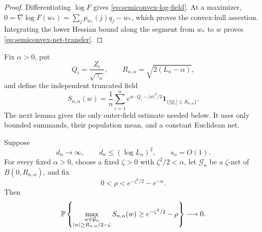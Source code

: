 \begin{proof}
Differentiating \(\log F\) gives \eqref{eq:semiconvex-log-field}.  At a
maximizer, \(0=\nabla\log F(w_*)=\sum_jp_{w_*}(j)q_j-w_*\), which proves
the convex-hull assertion.  Integrating the lower Hessian bound along the
segment from \(w_*\) to \(w\) proves
\eqref{eq:semiconvex-net-transfer}.
\end{proof}

Fix \(\alpha>0\), put
\[
 Q_i=\frac{Z_i}{\sqrt{\gamma_n}},\qquad
 R_{n,\alpha}=\sqrt{2(L_n-\alpha)},
\]
and define the independent truncated field
\[
 S_{n,\alpha}(w)
 =\frac1n\sum_{i=1}^n
 e^{w\cdot Q_i-|w|^2/2}
 \mathbf1_{\{|Q_i|\le R_{n,\alpha}\}}.
\]
The next lemma gives the only outer-field estimate needed below.  It uses
only bounded summands, their population mean, and a constant Euclidean net.

\begin{lemma}
\label{lem:slow-outside-shell}
Suppose
\[
 d_n\longrightarrow\infty,\qquad
 d_n\le(\log L_n)^2,\qquad s_n=O(1).
\]
For every fixed \(\alpha>0\), choose a fixed \(\zeta>0\) with
\(\zeta^2/2<\alpha\), let \(\mathcal G_n\) be a \(\zeta\)-net of
\(B(0,R_{n,\alpha})\), and fix
\[
 0<\rho<e^{-\zeta^2/2}-e^{-\alpha}.
\]
Then
\begin{equation}
\label{eq:slow-outside-shell}
 \mathbb P\left\{
  \max_{\substack{w\in\mathcal G_n\\
       |w|\ge R_{n,\alpha}/2-\zeta}}
  S_{n,\alpha}(w)
  \ge e^{-\zeta^2/2}-\rho
 \right\}\longrightarrow0.
\end{equation}
\end{lemma}

